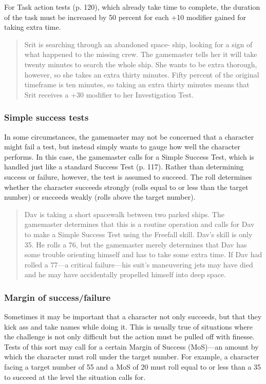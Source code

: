 For Task action tests (p. 120), which already take time to complete,
the duration of the task must be increased by 50 percent for each +10
modifier gained for taking extra time.

\begin{quotation}
  Srit is searching through an abandoned space- ship, looking for a
  sign of what happened to the missing crew. The gamemaster tells her
  it will take twenty minutes to search the whole ship. She wants to
  be extra thorough, however, so she takes an extra thirty
  minutes. Fifty percent of the original timeframe is ten minutes, so
  taking an extra thirty minutes means that Srit receives a +30
  modifier to her Investigation Test.
\end{quotation}

\subsubsection{Simple success tests}
\label{sec:simple-success-tests}

In some circumstances, the gamemaster may not be concerned that a
character might fail a test, but instead simply wants to gauge how
well the character performs. In this case, the gamemaster calls for a
Simple Success Test, which is handled just like a standard Success
Test (p. 117). Rather than determining success or failure, however,
the test is assumed to succeed.  The roll determines whether the
character succeeds strongly (rolls equal to or less than the target
number) or succeeds weakly (rolls above the target number).

\begin{quotation}
  Dav is taking a short spacewalk between two parked ships. The
  gamemaster determines that this is a routine operation and calls for
  Dav to make a Simple Success Test using the Freefall skill. Dav's
  skill is only 35. He rolls a 76, but the gamemaster merely
  determines that Dav has some trouble orienting himself and has to
  take some extra time.  If Dav had rolled a 77—a critical failure—his
  suit's maneuvering jets may have died and he may have accidentally
  propelled himself into deep space.
\end{quotation}

\subsubsection{Margin of success/failure}
\label{sec:marg-succ}

Sometimes it may be important that a character not only succeeds, but
that they kick ass and take names while doing it. This is usually true
of situations where the challenge is not only difficult but the action
must be pulled off with finesse. Tests of this sort may call for a
certain Margin of Success (MoS)—an amount by which the character must
roll under the target number.  For example, a character facing a
target number of 55 and a MoS of 20 must roll equal to or less than a
35 to succeed at the level the situation calls for.

